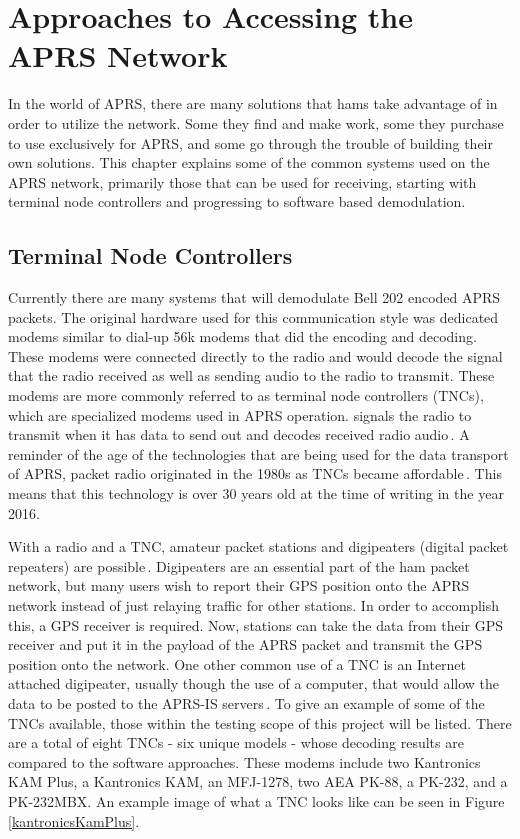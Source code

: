 \chapter{Approaches to Accessing the APRS Network}
In the world of APRS, there are many solutions that hams take advantage of in order to utilize the network. Some they find and make work, some they purchase to use exclusively for APRS, and some go through the trouble of building their own solutions. This chapter explains some of the common systems used on the APRS network, primarily those that can be used for receiving, starting with terminal node controllers and progressing to software based demodulation.

\section{Terminal Node Controllers}
Currently there are many systems that will demodulate Bell 202 encoded APRS packets. The original hardware used for this communication style was dedicated modems similar to dial-up 56k modems that did the encoding and decoding. These modems were connected directly to the radio and would decode the signal that the radio received as well as sending audio to the radio to transmit. These modems are more commonly referred to as terminal node controllers (TNCs), which are specialized modems used in APRS operation. signals the radio to transmit when it has data to send out and decodes received radio audio\,\cite{Wolfgang2005}. A reminder of the age of the technologies that are being used for the data transport of APRS, packet radio originated in the 1980s as TNCs became affordable\,\cite{Helms1992}. This means that this technology is over 30 years old at the time of writing in the year 2016.

With a radio and a TNC, amateur packet stations and digipeaters (digital packet repeaters) are possible\,\cite{Group2012,Wiki2012}. Digipeaters are an essential part of the ham packet network, but many users wish to report their GPS position onto the APRS network instead of just relaying traffic for other stations. In order to accomplish this, a GPS receiver is required. Now, stations can take the data from their GPS receiver and put it in the payload of the APRS packet and transmit the GPS position onto the network. One other common use of a TNC is an Internet attached digipeater, usually though the use of a computer, that would allow the data to be posted to the APRS-IS servers\,\cite{Community2015}. To give an example of some of the TNCs available, those within the testing scope of this project will be listed. There are a total of eight TNCs - six unique models - whose decoding results are compared to the software approaches. These modems include two Kantronics KAM Plus, a Kantronics KAM, an MFJ-1278, two AEA PK-88, a PK-232, and a PK-232MBX. An example image of what a TNC looks like can be seen in Figure \ref{kantronicsKamPlus}.

